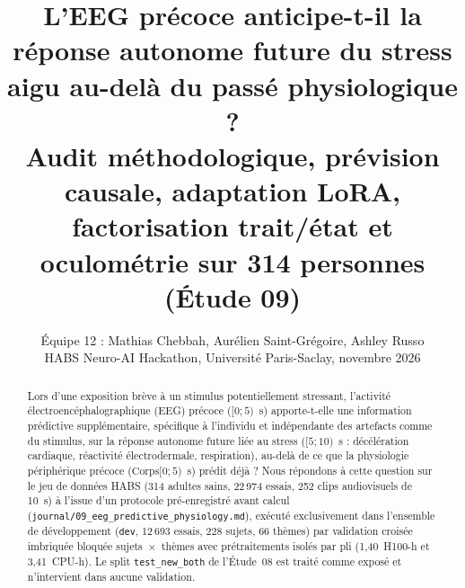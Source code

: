 \documentclass[10pt]{article}
\title{L'EEG précoce anticipe-t-il la réponse autonome future du stress aigu au-delà du passé physiologique ?\\
\large Audit méthodologique, prévision causale, adaptation LoRA, factorisation trait/état et oculométrie sur 314 personnes (Étude 09)}
\author{Équipe 12 : Mathias Chebbah, Aurélien Saint-Grégoire, Ashley Russo\\
\small HABS Neuro-AI Hackathon, Université Paris-Saclay, novembre 2026}
\date{}
\begin{document}
\maketitle

\begin{abstract}
\noindent Lors d'une exposition brève à un stimulus potentiellement stressant, l'activité électroencéphalographique (EEG) précoce ($[0 ; 5)$~s) apporte-t-elle une information prédictive supplémentaire, spécifique à l'individu et indépendante des artefacts comme du stimulus, sur la réponse autonome future liée au stress ($[5 ; 10)$~s : décélération cardiaque, réactivité électrodermale, respiration), au-delà de ce que la physiologie périphérique précoce ($\text{Corps}[0 ; 5)$~s) prédit déjà ? Nous répondons à cette question sur le jeu de données HABS (314 adultes sains, 22\,974 essais, 252 clips audiovisuels de 10~s) à l'issue d'un protocole pré-enregistré avant calcul (\texttt{journal/09\_eeg\_predictive\_physiology.md}), exécuté exclusivement dans l'ensemble de développement (\texttt{dev}, 12\,693 essais, 228 sujets, 66 thèmes) par validation croisée imbriquée bloquée sujets~$\times$~thèmes avec prétraitements isolés par pli (1,40~H100-h et 3,41~CPU-h). Le split \texttt{test\_new\_both} de l'Étude~08 est traité comme exposé et n'intervient dans aucune validation.


\end{abstract}
\end{document}
